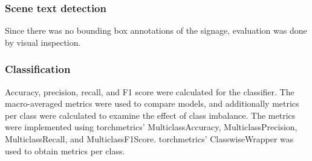 \subsubsection{Scene text detection}

Since there was no bounding box annotations of the signage, evaluation was done by visual inspection.

\subsubsection{Classification}

Accuracy, precision, recall, and F1 score were calculated for the classifier. The macro-averaged metrics were used to compare models, and additionally metrics per class were calculated to examine the effect of class imbalance. The metrics were implemented using torchmetrics' MulticlassAccuracy, MulticlassPrecision, MulticlassRecall, and MulticlassF1Score. torchmetrics' ClasswiseWrapper was used to obtain metrics per class. 



